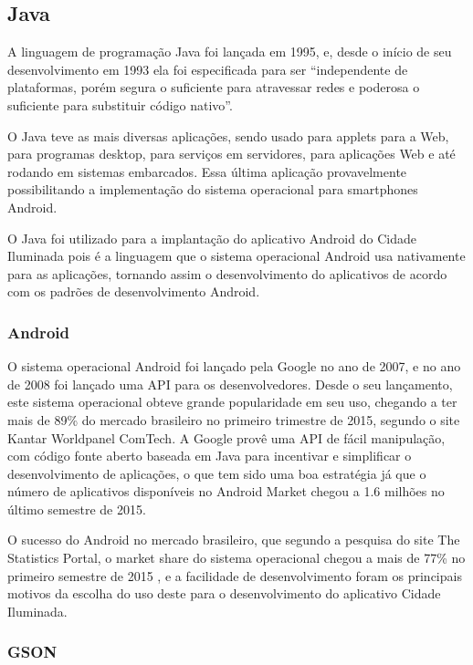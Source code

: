 \documentclass[
	article,			%
	11pt,				%
	oneside,			%
	a4paper,			%
	english,			%
	brazil,				%
	sumario=tradicional
	]{abntex2}
\begin{document}
\subsection{Java}

A linguagem de programação Java foi lançada em 1995, e, desde o início de seu desenvolvimento em 1993 ela foi especificada para ser “independente de plataformas, porém segura o suficiente para atravessar redes e poderosa o suficiente para substituir código nativo”. \cite{java}

O Java teve as mais diversas aplicações, sendo usado para applets para a Web, para programas desktop, para serviços em servidores, para aplicações Web e até rodando em sistemas embarcados.
Essa última aplicação provavelmente possibilitando a implementação do sistema operacional para smartphones Android.

O Java foi utilizado para a implantação do aplicativo Android do Cidade Iluminada pois é a linguagem que o sistema operacional Android usa nativamente para as aplicações, tornando assim o desenvolvimento do aplicativos de acordo com os padrões de desenvolvimento Android.

\subsubsection{Android}

O sistema operacional Android foi lançado pela Google no ano de 2007, e no ano de 2008 foi lançado uma API para os desenvolvedores.
Desde o seu lançamento, este sistema operacional obteve grande popularidade em seu uso, chegando a ter mais de 89\% do mercado brasileiro no primeiro trimestre de 2015, segundo o site Kantar Worldpanel ComTech. \cite{comtech}
A Google provê uma API de fácil manipulação, com código fonte aberto baseada em Java para incentivar e simplificar o desenvolvimento de aplicações, o que tem sido uma boa estratégia já que o número de aplicativos disponíveis no Android Market chegou a 1.6 milhões no último semestre de 2015.

O sucesso do Android no mercado brasileiro, que segundo a pesquisa do site The Statistics Portal, o market share do sistema operacional chegou a mais de 77\% no primeiro semestre de 2015 \cite{statista}, e a facilidade de desenvolvimento foram os principais motivos da escolha do uso deste para o desenvolvimento do aplicativo Cidade Iluminada.

\subsubsection{GSON}
\end{document}
